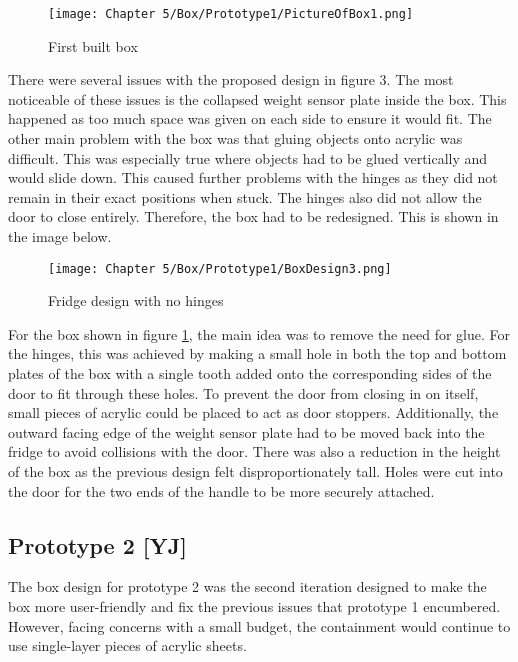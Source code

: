 \begin{figure}[H]        
    \centering
    \texttt{[image: Chapter 5/Box/Prototype1/PictureOfBox1.png]}
    \caption{First built box}
\end{figure} 

There were several issues with the proposed design in figure 3.
The most noticeable of these issues is the collapsed weight sensor plate inside the box.
This happened as too much space was given on each side to ensure it would fit.
The other main problem with the box was that gluing objects onto acrylic was difficult.
This was especially true where objects had to be glued vertically and would slide down.
This caused further problems with the hinges as they did not remain in their exact positions when stuck.
The hinges also did not allow the door to close entirely.
Therefore, the box had to be redesigned.
This is shown in the image below.

\begin{figure}[H]        
    \centering
    \texttt{[image: Chapter 5/Box/Prototype1/BoxDesign3.png]}
    \caption{Fridge design with no hinges}
    \label{fig:hindgless}
\end{figure} 

For the box shown in figure \ref{fig:hindgless}, the main idea was to remove the need for glue.
For the hinges, this was achieved by making a small hole in both the top and bottom plates of the box with a single tooth added onto the corresponding sides of the door to fit through these holes.
To prevent the door from closing in on itself, small pieces of acrylic could be placed to act as door stoppers.
Additionally, the outward facing edge of the weight sensor plate had to be moved back into the fridge to avoid collisions with the door.
There was also a reduction in the height of the box as the previous design felt disproportionately tall.
Holes were cut into the door for the two ends of the handle to be more securely attached.

\subsection{Prototype 2 [YJ]}

The box design for prototype 2 was the second iteration designed to make the box more user-friendly and fix the previous issues that prototype 1 encumbered.
However, facing concerns with a small budget, the containment would continue to use single-layer pieces of acrylic sheets.


